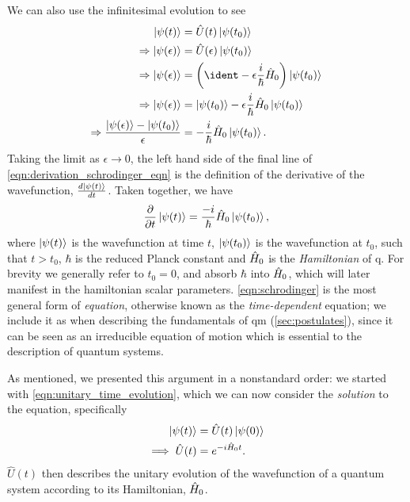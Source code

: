 \par 
We can also use the infinitesimal evolution to see 
\begin{equation}
    \label{eqn:derivation_schrodinger_eqn}
    \begin{split}
        \ket{\psi(t)} &= \hat{U}(t) \ket{\psi(t_0)}
        \\ \Rightarrow \ket{\psi(\epsilon)} &= \hat{U}(\epsilon) \ket{\psi(t_0)}
        \\ \Rightarrow 
        \ket{\psi(\epsilon)} &= \left(\ident - \epsilon \frac{i}{\hbar} \ho \right) \ket{\psi(t_0)}
        \\ \Rightarrow \ket{\psi(\epsilon)} &= \ket{\psi(t_0)} - \epsilon \frac{i}{\hbar} \ho \ket{\psi(t_0)}
        \\ \Rightarrow \frac{\ket{\psi(\epsilon)} - \ket{\psi(t_0)} }{\epsilon}  &= - \frac{i}{\hbar} \ho \ket{\psi(t_0)}.
    \end{split}
\end{equation}
Taking the limit as $\epsilon \rightarrow 0 $, the left hand side of the final line of \cref{eqn:derivation_schrodinger_eqn} is the definition
    of the derivative of the wavefunction, $\frac{d \ket{\psi(t)}}{dt}$. 
Taken together, we have 
\begin{equation}
    \label{eqn:schrodinger}
    \frac{\partial}{\partial t} \ket{\psi(t)} = \frac{-i}{\hbar} \hat{H}_0 \ket{\psi(t_0)},
\end{equation}
    where $\ket{\psi(t)}$ is the wavefunction at time $t$, 
    $\ket{\psi(t_0)}$ is the wavefunction at $t_0$, such that $t > t_0$, 
    $\hbar$ is the reduced Planck constant and 
    $\hat{H}_0$ is the \emph{Hamiltonian} of \gls{q}. 
For brevity we generally refer to $t_0 = 0$, and absorb $\hbar$ into $\hat{H}_0$, which will later manifest in the \gls{hamiltonian} scalar parameters. 
\cref{eqn:schrodinger} is the most general form of \emph{\schrodinger equation}, 
    otherwise known as the \emph{time-dependent} \schrodinger equation; 
    we include it as  when describing the fundamentals of \gls{qm} (\cref{sec:postulates}), 
    since it can be seen as an irreducible equation of motion which is essential to the description of quantum systems. 
\par 

As mentioned, we presented this argument in a nonstandard order:
    we started with \cref{eqn:unitary_time_evolution}, which we can now consider the \emph{solution} to the \schrodinger equation, 
    specifically
\begin{equation}
    \label{eqn:unitary_evolution}
    \begin{split}
        \ket{\psi(t)} &= \hat{U}(t) \ket{\psi(0)}
        \\
        \implies \hat{U}(t) &= e^{-i \hat{H}_0 t}.
    \end{split}
\end{equation}
$\hat{U}(t)$ then describes the unitary evolution of the wavefunction of a 
    quantum system according to its Hamiltonian, $\hat{H}_0$. 
\par 

